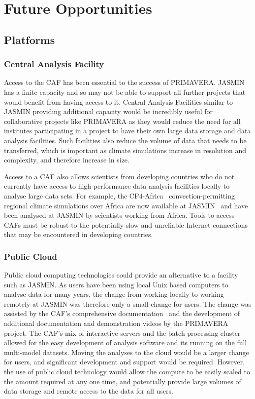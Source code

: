 \documentclass[gmd, manuscript]{copernicus}
\begin{document}
\section{Future Opportunities}

\subsection{Platforms}

\subsubsection{Central Analysis Facility}
Access to the CAF has been essential to the success of PRIMAVERA. JASMIN has a finite capacity and so may not be able to support all further projects that would benefit from having access to it. Central Analysis Facilities similar to JASMIN providing additional capacity would be incredibly useful for collaborative projects like PRIMAVERA as they would reduce the need for all institutes participating in a project to have their own large data storage and data analysis facilities. Such facilities also reduce the volume of data that needs to be transferred, which is important as climate simulations increase in resolution and complexity, and therefore increase in size.

Access to a CAF also allows scientists from developing countries who do not currently have access to high-performance data analysis facilities locally to analyse large data sets. For example, the CP4-Africa~\citep{Stratton2018} convection-permitting regional climate simulations over Africa are now available at JASMIN~\citep{Senior2019} and have been analysed at JASMIN by scientists working from Africa. Tools to access CAFs must be robust to the potentially slow and unreliable Internet connections that may be encountered in developing countries.


\subsubsection{Public Cloud}
Public cloud computing technologies could provide an alternative to a facility such as JASMIN. As users have been using local Unix based computers to analyse data for many years, the change from working locally to working remotely at JASMIN was therefore only a small change for users. The change was assisted by the CAF's comprehensive documentation~\citep{JASMINdocs} and the development of additional documentation and demonstration videos by the PRIMAVERA project. The CAF's mix of interactive servers and the batch processing cluster allowed for the easy development of analysis software and its running on the full multi-model datasets. Moving the analyses to the cloud would be a larger change for users, and significant development and support would be required. However, the use of public cloud technology would allow the compute to be easily scaled to the amount required at any one time, and potentially provide large volumes of data storage and remote access to the data for all users.
\end{document}
